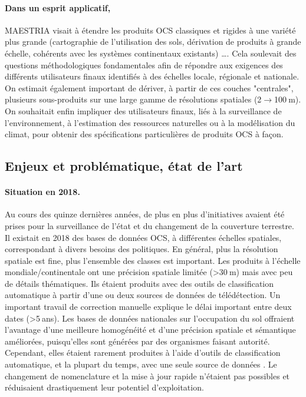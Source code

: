 \paragraph{Dans un esprit applicatif,} MAESTRIA visait à étendre les produits OCS classiques et rigides à une variété plus grande (cartographie de l'utilisation des sols, dérivation de produits à grande échelle, cohérents avec les systèmes continentaux existants) \ldots. Cela soulevait des questions méthodologiques fondamentales afin de répondre aux exigences des différents utilisateurs finaux identifiés à des échelles locale, régionale et nationale. On estimait également important de dériver, à partir de ces couches "centrales", plusieurs sous-produits sur une large gamme de résolutions spatiales (2$\rightarrow$100$\:$m). On souhaitait enfin impliquer des utilisateurs finaux, liés à la surveillance de l'environnement, à l'estimation des ressources naturelles ou à la modélisation du climat, pour obtenir des spécifications particulières de produits OCS à façon.

\subsection{Enjeux et problématique, état de l’art}

\paragraph{Situation en 2018.} Au cours des quinze dernières années, de plus en plus d'initiatives avaient été prises pour la surveillance de l'état et du changement de la couverture terrestre. Il existait en 2018 des bases de données OCS, à différentes échelles spatiales, correspondant à divers besoins des politiques. En général, plus la résolution spatiale est fine, plus l'ensemble des classes est important. Les produits à l'échelle mondiale/continentale ont une précision spatiale limitée (>30$\:$m) mais avec peu de détails thématiques. Ils étaient produits avec des outils de classification automatique à partir d'une ou deux sources de données de télédétection. Un important travail de correction manuelle explique le délai important entre deux dates (>5$\:$ans). Les bases de données nationales sur l'occupation du sol offraient l'avantage d'une meilleure homogénéité et d'une précision spatiale et sémantique améliorées, puisqu'elles sont générées par des organismes faisant autorité. Cependant, elles étaient rarement produites à l'aide d'outils de classification automatique, et la plupart du temps,
avec une seule source de données . Le changement de nomenclature et la mise à jour rapide n'étaient pas possibles et réduisaient drastiquement leur potentiel d'exploitation.

